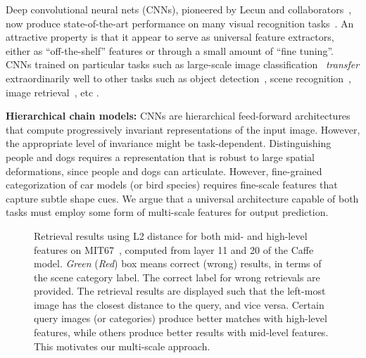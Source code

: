 \documentclass[10pt,twocolumn,letterpaper]{article}
\begin{document}
Deep convolutional neural nets (CNNs), pioneered by Lecun and collaborators~\cite{lecun1998gradient}, now produce state-of-the-art performance on many visual recognition tasks~\cite{AlexNet, veryDeep, GoogLeNet}. An attractive property is that it appear to serve as universal feature extractors, either as ``off-the-shelf'' features or through a small amount of ``fine tuning''. CNNs trained on particular tasks such as large-scale image classification~\cite{ImageNet} {\em transfer} extraordinarily well to other tasks such as object detection~\cite{rcnn}, scene recognition~\cite{zhoulearning}, image retrieval~\cite{Gong14}, etc \cite{cnn_baseline}.

{\bf Hierarchical chain models:}  CNNs are 
hierarchical feed-forward architectures that compute progressively invariant representations of the input image. However, the appropriate level of invariance might be task-dependent. Distinguishing people and dogs requires a representation that is robust to large spatial deformations, since people and dogs can articulate. However, fine-grained categorization of car models (or bird species) requires fine-scale features that capture subtle shape cues. We argue that a universal architecture capable of both tasks must employ some form of multi-scale features for output prediction.

\begin{figure}
\centering
\caption{Retrieval results using L2 distance for both mid- and high-level features on MIT67~\cite{MIT67}, computed from layer 11 and 20 of the Caffe model. \textit{Green} (\textit{Red}) box means correct (wrong) results, in terms of the scene category label. The correct label for wrong retrievals are provided. The retrieval results are displayed such that the left-most image has the closest distance to the query, and vice versa. Certain query images (or categories) produce better matches with high-level features, while others produce better results with mid-level features. This motivates our multi-scale approach.}
\label{fig:moti}
\end{figure}
\end{document}
